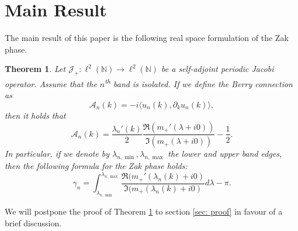 \documentclass[a4paper,reqno,twoside]{amsart}
\numberwithin{equation}{section}
\newtheorem{theorem}{Theorem}[section]
\theoremstyle{definition}
\newcommand{\<}{\ensuremath \leq}
\renewcommand{\>}{\ensuremath \geq}
\begin{document}



\section{Main Result}
The main result of this paper is the following real space formulation of the 
Zak phase.
\begin{theorem}\label{thm: main}
    Let $\mathcal{J_+}:\ell^2(\mathbb{N})\rightarrow\ell^2(\mathbb{N})$ be a self-adjoint periodic Jacobi operator. Assume that the $n$\textsuperscript{th} band is isolated. 
If we define the Berry connection as
    \begin{equation}
        \mathcal{A}_n(k) = -i\langle u_n(k), \partial_ku_n(k)\rangle,
    \end{equation}
    then it holds that
    \begin{equation}
        \mathcal{A}_n(k) = \frac{\lambda_n'(k)}{2}\frac{\Re(m_+'(\lambda+i0))}{\Im(m_+(\lambda+i0))} - \frac{1}{2}.
    \end{equation}
    In particular, if we denote by $\lambda_{n,\min},\lambda_{n,\max}$ the lower and upper band edges, then the following formula for the Zak phase holds:
    \begin{equation}\label{eq: zak_new}
        \gamma_n = \int_{\lambda_{n,\min}}^{\lambda_{n,\max}} \frac{\Re(m_+'(\lambda_n(k) + i0)}{\Im(m_+(\lambda_n(k)+i0)}d\lambda - \pi.
    \end{equation}
\end{theorem}
We will postpone the proof of Theorem \ref{thm: main} to section \ref{sec: proof} in favour of a brief discussion.
\end{document}
